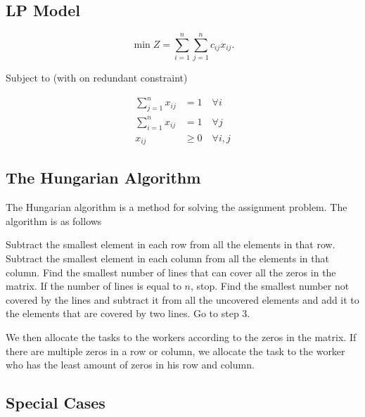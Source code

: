 \documentclass{report}
\begin{document}
\subsection{LP Model}

\[
	\min Z = \sum_{i=1}^{n}\sum_{j=1}^{n} c_{ij}x_{ij}
	.\]

Subject to (with on redundant constraint)

\begin{align*}
	\sum_{j=1}^{n} x_{ij} & = 1 \quad \forall i      \\
	\sum_{i=1}^{n} x_{ij} & = 1 \quad \forall j      \\
	x_{ij}                & \geq 0 \quad \forall i,j
\end{align*}

\subsection{The Hungarian Algorithm}


The Hungarian algorithm is a method for solving the assignment problem. The algorithm is as follows

\begin{enumerate}
	\ii Subtract the smallest element in each row from all the elements in that row.
	\ii Subtract the smallest element in each column from all the elements in that column.
	\ii Find the smallest number of lines that can cover all the zeros in the matrix. If the number of lines is equal to $n$, stop.
	\ii Find the smallest number not covered by the lines and subtract it from all the uncovered elements and add it to the elements that are covered by two lines.
	\ii Go to step 3.
\end{enumerate}

We then allocate the tasks to the workers according to the zeros in the matrix. If there are multiple zeros in a row or column, we allocate the task to the worker who has the least amount of zeros in his row and column.

\subsection{Special Cases}
\end{document}
